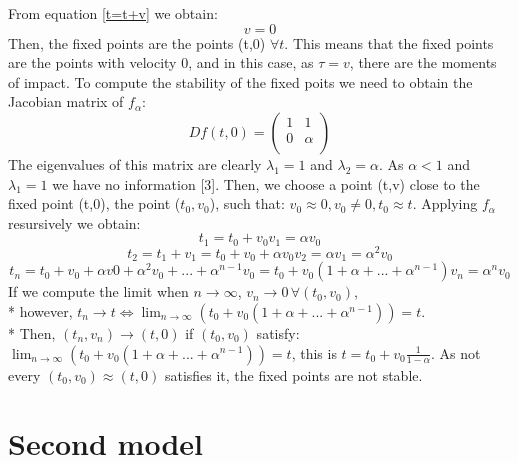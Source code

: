 \documentclass[a4paper]{article}
\begin{document}
From equation \ref{t=t+v} we obtain:
\begin{equation}
v=0
\end{equation}
Then, the fixed points are the points (t,0) $\forall t$.
This means that the fixed points are the points with velocity 0, and in this case,
as $\tau=v$, there are the moments of impact.
To compute the stability of the fixed poits we need to obtain the Jacobian matrix of $f_\alpha$:
\begin{equation}
Df(t,0)=\begin{pmatrix} 
1 & 1\\
0 & \alpha \\
\end{pmatrix}
\end {equation}
The eigenvalues of this matrix are clearly $\lambda_1=1$ and $\lambda_2=\alpha$. As $\alpha<1$ and $\lambda_1=1$ we have no information [3].
Then, we choose a point (t,v) close to the fixed point (t,0), the point ($t_0,v_0$), such that:
$v_0 \approx 0 , v_0\neq 0,t_0\approx t$. Applying $f_\alpha$ resursively we obtain:
\begin{equation}
t_1=t_0+v_0
v_1=\alpha v_0 
\end{equation}
\begin{equation}
t_2=t_1+v_1=t_0+v_0+\alpha v_0
v_2=\alpha v_1=\alpha^2 v_0
\end{equation}
\begin{equation}
t_n=t_0+v_0+\alpha v0+\alpha^2 v_0+...+\alpha^{n-1} v_0=t_0+v_0(1+\alpha+...+\alpha^{n-1})
v_n=\alpha^n v_0
\end{equation}
If we compute the limit when $n\rightarrow \infty$, $v_n\rightarrow 0 \, \forall(t_0,v_0)$,
\\*
however, $t_n\rightarrow t \Leftrightarrow \lim_{n \rightarrow \infty} (t_0+v_0(1+\alpha+...+\alpha^{n-1}))=t$.
\\*
Then, $(t_n,v_n)\rightarrow (t,0)$ if $(t_0,v_0)$ satisfy: $\lim_{n \rightarrow \infty} (t_0+v_0(1+\alpha+...+\alpha^{n-1}))=t$, this is $t=t_0+v_0\frac{1}{1-\alpha}$.
As not every $(t_0,v_0 )\approx (t,0)$ satisfies it, the fixed points are not stable. 




\newpage




\section{Second model}
\end{document}
